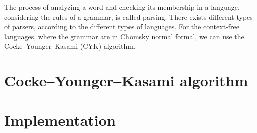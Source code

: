 \documentclass[12pt]{article}
\begin{document}

The process of analyzing a word and checking its membership in a language, considering the rules of a grammar, is called parsing. There exists different types of parsers, according to the different types of languages. For the context-free languages, where the grammar are in Chomsky normal formal, we can use the Cocke–Younger–Kasami (CYK) algorithm. 







\section{Cocke–Younger–Kasami algorithm}\label{sec:cyk}

\section{Implementation}\label{sec:imp}




\end{document}
